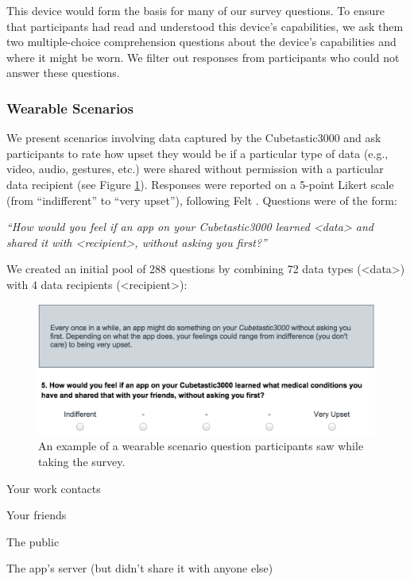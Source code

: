This device would form the basis for many of our survey questions. To ensure that participants had read and understood this device's capabilities, we ask them two multiple-choice comprehension questions about the device's capabilities and where it might be worn. We filter out responses from participants who could not answer these questions.

\subsubsection{Wearable Scenarios}
We present scenarios involving data captured by the Cubetastic3000 and ask participants to rate how upset they would be if a particular type of data (e.g., video, audio, gestures, etc.) were shared without permission with a particular data recipient (see Figure \ref{fig:prompt}). Responses were reported on a 5-point Likert scale (from ``indifferent'' to ``very upset''), following Felt \etal\cite{Felt}. Questions were of the form: 

\textit{``How would you feel if an app on your Cubetastic3000 learned <data> and shared it with <recipient>, without asking you first?''}

We created an initial pool of 288 questions by combining 72 data types (<data>) with 4 data recipients (<recipient>): %

\begin{figure}[t]
	\centering
	\includegraphics[width=\columnwidth]{images/prompt.pdf}
	\caption{An example of a wearable scenario question participants saw while taking the survey.}
	\label{fig:prompt}
\end{figure}

\begin{packed_item}
\item Your work contacts
\item Your friends
\item The public
\item The app's server (but didn't share it with anyone else) %
\end{packed_item}

